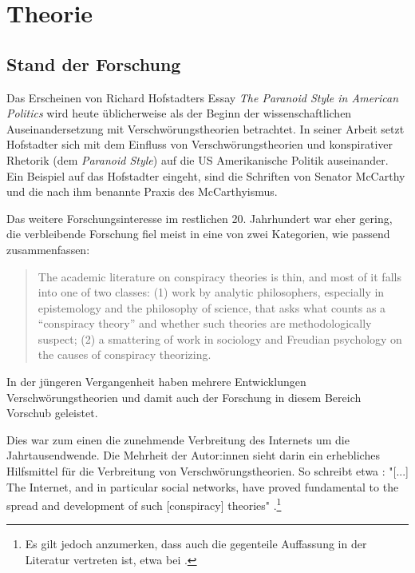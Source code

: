 \section{Theorie}

\subsection{Stand der Forschung}

Das Erscheinen von Richard Hofstadters Essay \textit{The Paranoid Style in American Politics} \parencite[][]{hofstadter_2008} wird heute üblicherweise als der Beginn der wissenschaftlichen Auseinandersetzung mit Verschwörungstheorien betrachtet.
In seiner Arbeit setzt Hofstadter sich mit dem Einfluss von Verschwörungstheorien und konspirativer Rhetorik (dem \textit{Paranoid Style}) auf die US Amerikanische Politik auseinander.
Ein Beispiel auf das Hofstadter eingeht, sind die Schriften von Senator McCarthy und die nach ihm benannte Praxis des McCarthyismus.

Das weitere Forschungsinteresse im restlichen 20. Jahrhundert war eher gering, die verbleibende Forschung fiel meist in eine von zwei Kategorien, wie \textcite{sunstein_2008} passend zusammenfassen:

\begin{quotation}
    The academic literature on conspiracy theories is thin, and most of it falls into one 
    of two classes: (1) work by analytic philosophers, especially in epistemology and the 
    philosophy of science, that asks what counts as a “conspiracy theory” and whether such theories are methodologically suspect; (2) a smattering of work in sociology and Freudian psychology on the causes of conspiracy theorizing. \parencite[][2]{sunstein_2008}
\end{quotation}

In der jüngeren Vergangenheit haben mehrere Entwicklungen Verschwörungstheorien und damit auch der Forschung in diesem Bereich Vorschub geleistet.

Dies war zum einen die zunehmende Verbreitung des Internets um die Jahrtausendwende.
Die Mehrheit der Autor:innen sieht darin ein erhebliches Hilfsmittel für die Verbreitung von Verschwörungstheorien.
So schreibt etwa \textcite{stano_2020}: "[...] The Internet, and in particular social networks, have proved fundamental to the spread and development of such [conspiracy] theories" \parencite[][492]{stano_2020}.\footnote{Es gilt jedoch anzumerken, dass auch die gegenteile Auffassung in der Literatur vertreten ist, etwa bei \textcite{clarke_2007}.}


